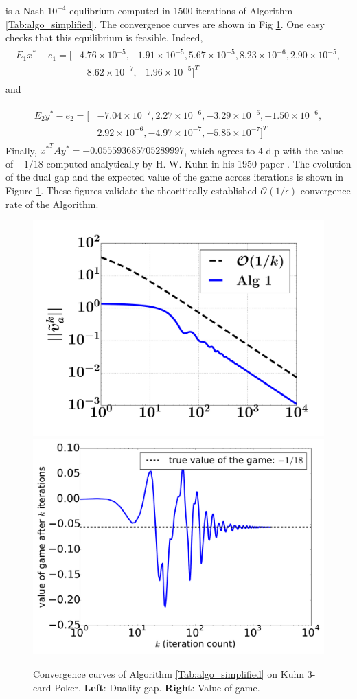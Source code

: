 \documentclass[12pt]{article}
\begin{document}
is a Nash $10^{-4}$-equlibrium computed in 1500 iterations of Algorithm  \ref{Tab:algo_simplified}. The convergence curves are shown in Fig \ref{Tab:dgap_curve}. One easy checks that this equilibrium is feasible. Indeed,
\begin{eqnarray*}
  \begin{split}
    E_1x^* - e_1 = [&4.76 \times 10^{-5}, -1.91 \times 10^{-5}, 5.67 \times 10^{-5}, 8.23 \times 10^{-6}, 2.90 \times 10^{-5}, \\&
      -8.62 \times 10^{-7}, -1.96 \times 10^{-5}]^T
    \end{split}
\end{eqnarray*}
and

\begin{eqnarray*}
  \begin{split}
    E_2y^* - e_2 = [&-7.04 \times 10^{-7}, 2.27 \times 10^{-6}, -3.29 \times 10^{-6}, -1.50 \times 10^{-6},\\
      &2.92 \times 10^{-6}, -4.97 \times 10^{-7}, -5.85 \times 10^{-7}]^T
    \end{split}
\end{eqnarray*}
Finally, ${x^*}^TAy^* = -0.055593685705289997$, which agrees to 4 d.p with the value of $-1 / 18$ computed analytically by H. W. Kuhn in his 1950 paper \cite{kuhn}.
The evolution of the dual gap and the expected value of the game across iterations is shown in Figure \ref{Tab:dgap_curve}. These figures validate the theoritically established $\mathcal{O}(1/\epsilon)$ convergence rate of the Algorithm.

\begin{figure}
  \includegraphics[width=.56\linewidth]{Kuhn3112_dgap.pdf}
  \includegraphics[width=.56\linewidth]{Kuhn3112_NE.pdf}
  \caption{Convergence curves of Algorithm \ref{Tab:algo_simplified} on Kuhn 3-card Poker.
  \textbf{Left}: Duality gap. \textbf{Right}: Value of game.}
  \label{Tab:dgap_curve}
\end{figure}
\end{document}
